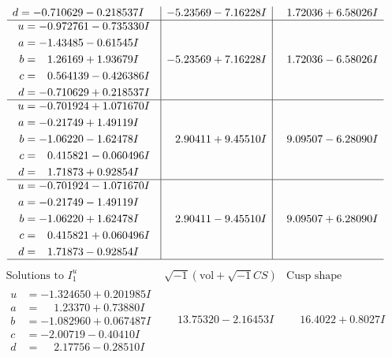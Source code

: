 \documentclass[1p]{elsarticle_modified}
\theoremstyle{definition}
\newcommand{\I}{\sqrt{-1}}
\begin{document}
$$\begin{array}{c|c|c}
\begin{aligned}
d &= -0.710629 - 0.218537 I\end{aligned}
 & -5.23569 - 7.16228 I & \phantom{-}1.72036 + 6.58026 I \\ \hline\begin{aligned}
u &= -0.972761 - 0.735330 I \\
a &= -1.43485 - 0.61545 I \\
b &= \phantom{-}1.26169 + 1.93679 I \\
c &= \phantom{-}0.564139 - 0.426386 I \\
d &= -0.710629 + 0.218537 I\end{aligned}
 & -5.23569 + 7.16228 I & \phantom{-}1.72036 - 6.58026 I \\ \hline\begin{aligned}
u &= -0.701924 + 1.071670 I \\
a &= -0.21749 + 1.49119 I \\
b &= -1.06220 - 1.62478 I \\
c &= \phantom{-}0.415821 - 0.060496 I \\
d &= \phantom{-}1.71873 + 0.92854 I\end{aligned}
 & \phantom{-}2.90411 + 9.45510 I & \phantom{-}9.09507 - 6.28090 I \\ \hline\begin{aligned}
u &= -0.701924 - 1.071670 I \\
a &= -0.21749 - 1.49119 I \\
b &= -1.06220 + 1.62478 I \\
c &= \phantom{-}0.415821 + 0.060496 I \\
d &= \phantom{-}1.71873 - 0.92854 I\end{aligned}
 & \phantom{-}2.90411 - 9.45510 I & \phantom{-}9.09507 + 6.28090 I\\
 \hline 
 \end{array}$$\newpage$$\begin{array}{c|c|c}  
\text{Solutions to }I^u_{1}& \I (\text{vol} + \sqrt{-1}CS) & \text{Cusp shape}\\
 \hline 
\begin{aligned}
u &= -1.324650 + 0.201985 I \\
a &= \phantom{-}1.23370 + 0.73880 I \\
b &= -1.082960 + 0.067487 I \\
c &= -2.00719 - 0.40410 I \\
d &= \phantom{-}2.17756 - 0.28510 I\end{aligned}
 & \phantom{-}13.75320 - 2.16453 I & \phantom{-}16.4022 + 0.8027 I \\ \hline\begin{aligned}

\end{aligned}
\end{array}$$
\end{document}

